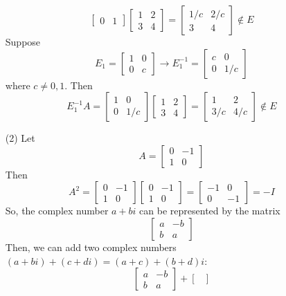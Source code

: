 \documentclass[12pt]{article}
\begin{document}
\begin{itemize}
$$\begin{bmatrix}
0 & 1
\end{bmatrix}\begin{bmatrix}
1 & 2 \\
3 & 4
\end{bmatrix} = \begin{bmatrix}
1/c & 2/c \\
3 & 4
\end{bmatrix} \not \in E$$
Suppose
$$E_1 = \begin{bmatrix}
1 & 0 \\
0 & c
\end{bmatrix} \rightarrow E_1^{-1} = \begin{bmatrix}
c & 0 \\
0 & 1/c
\end{bmatrix}$$
where $c \neq 0, 1$. Then
$$E_1^{-1}A = \begin{bmatrix}
1 & 0 \\
0 & 1/c
\end{bmatrix}\begin{bmatrix}
1 & 2 \\
3 & 4
\end{bmatrix} = \begin{bmatrix}
1 & 2 \\
3/c & 4/c
\end{bmatrix} \not \in E$$
\item[(2)]
Let
$$A = \begin{bmatrix}
0 & -1 \\
1 & 0
\end{bmatrix}$$
Then
$$A^2 = \begin{bmatrix}
0 & -1 \\
1 & 0
\end{bmatrix}\begin{bmatrix}
0 & -1 \\
1 & 0
\end{bmatrix} = \begin{bmatrix}
-1 & 0 \\
0 & -1
\end{bmatrix} = -I$$
So, the complex number $a + bi$ can be represented by the matrix
$$\begin{bmatrix}
a & -b \\
b & a
\end{bmatrix}$$
Then, we can add two complex numbers $(a + bi) + (c + di) = (a + c) + (b + d)i$:
$$\begin{bmatrix}
a & -b \\
b & a
\end{bmatrix} + \begin{bmatrix}

\end{bmatrix}$$
\end{itemize}
\end{document}
